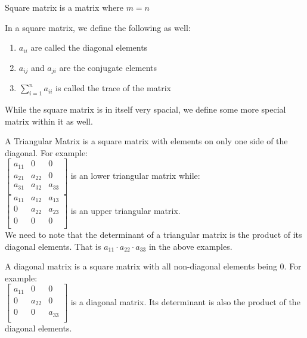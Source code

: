 \begin{definition}
    Square matrix is a matrix where $m=n$
\end{definition}
In a square matrix, we define the following as well:\\
\begin{definition}
    \begin{enumerate}
        \item $a_{ii}$ are called the diagonal elements\\
        \item $a_{ij}$ and $a_{ji}$ are the conjugate elements\\
        \item $\sum^n_{i=1} a_{ii}$ is called the trace of the matrix\\
    \end{enumerate}
\end{definition}
While the square matrix is in itself very spacial, we define some more special matrix within it as well.\\
\begin{definition}
    A Triangular Matrix is a square matrix with elements on only one side of the diagonal. For example:\\
    $\begin{bmatrix}
        a_{11} & 0 & 0\\
        a_{21} & a_{22} & 0\\
        a_{31} & a_{32} & a_{33}\\
    \end{bmatrix}$
    is an lower triangular matrix while:\\
    $\begin{bmatrix}
        a_{11} & a_{12} & a_{13}\\
        0 & a_{22} & a_{23}\\
        0 & 0 & 0\\
    \end{bmatrix}$
    is an upper triangular matrix.\\
    We need to note that the determinant of a triangular matrix is the product of its diagonal elements. That is $a_{11} \cdot a_{22} \cdot a_{33}$ in the above examples.
\end{definition}
\begin{definition}
    A diagonal matrix is a square matrix with all non-diagonal elements being 0. For example:\\
    $\begin{bmatrix}
        a_{11} & 0 & 0\\
        0 & a_{22} & 0\\
        0 & 0 & a_{33}\\
    \end{bmatrix}$
    is a diagonal matrix. Its determinant is also the product of the diagonal elements.
\end{definition}
